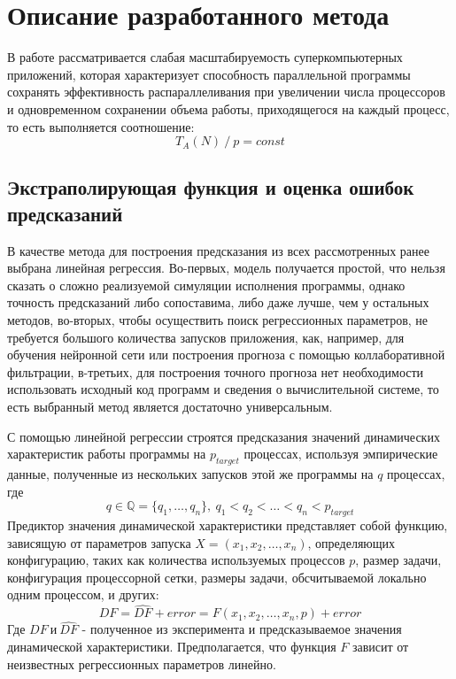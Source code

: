 \section{Описание разработанного метода}
	В работе рассматривается слабая масштабируемость суперкомпьютерных приложений, которая характеризует способность параллельной программы сохранять эффективность распараллеливания при увеличении числа процессоров и одновременном сохранении объема работы, приходящегося на каждый процесс, то есть выполняется соотношение:
	\begin{equation}\label{weak_sc}
	T_A(N)\:/\:p = const
	\end{equation}

	\subsection{Экстраполирующая функция и оценка ошибок предсказаний}
		В качестве метода для построения предсказания из всех рассмотренных ранее выбрана линейная регрессия. Во-первых, модель получается простой, что нельзя сказать о сложно реализуемой симуляции исполнения программы, однако точность предсказаний либо сопоставима, либо даже лучше, чем у остальных методов, во-вторых, чтобы осуществить поиск регрессионных параметров, не требуется большого количества запусков приложения, как, например, для обучения нейронной сети или построения прогноза с помощью коллаборативной фильтрации, в-третьих, для построения точного прогноза нет необходимости использовать исходный код программ и сведения о вычислительной системе, то есть выбранный метод является достаточно универсальным.%

		С помощью линейной регрессии строятся предсказания значений динамических характеристик работы программы на \(p_{target}\) процессах, используя эмпирические данные, полученные из нескольких запусков этой же программы на \(q\) процессах, где
		\[q \in \mathbb{Q} = \{q_1,\ldots, q_n\},\ q_1 < q_2 < \ldots < q_n < p_{target}\]
		Предиктор значения динамической характеристики представляет собой функцию, зависящую от параметров запуска \(X = (x_1, x_2, \ldots, x_n)\), определяющих конфигурацию, таких как количества используемых процессов \(p\), размер задачи, конфигурация процессорной сетки, размеры задачи, обсчитываемой локально одним процессом, и других:
		\begin{equation}\label{main_formula}
		DF = \hat{DF} + error = F(x_1, x_2, \ldots, x_n, p) + error
		\end{equation}
		Где \(DF\ и\ \hat{DF}\) - полученное из эксперимента и предсказываемое значения динамической характеристики. Предполагается, что функция \(F\) зависит от неизвестных регрессионных параметров линейно.

